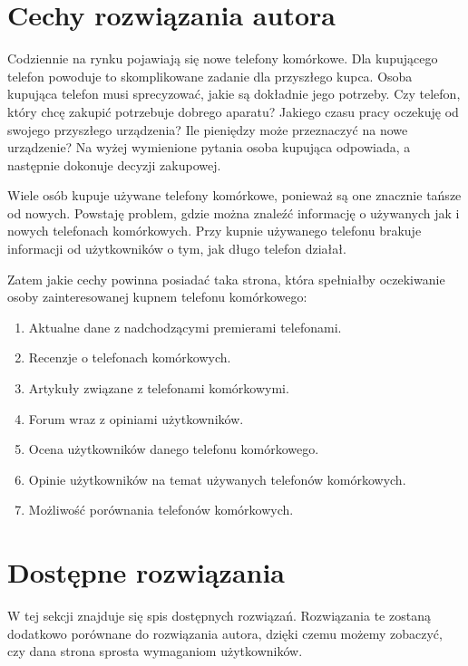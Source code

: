 \section{Cechy rozwiązania autora}
\label{ideal_solution}
Codziennie na rynku pojawiają się nowe telefony komórkowe. Dla kupującego telefon powoduje to skomplikowane zadanie dla przyszłego kupca. Osoba kupująca telefon musi sprecyzować, jakie są dokładnie jego potrzeby. Czy telefon, który chcę zakupić potrzebuje dobrego aparatu? Jakiego czasu pracy oczekuję od swojego przyszłego urządzenia? Ile pieniędzy może przeznaczyć na nowe urządzenie? Na wyżej wymienione pytania osoba kupująca odpowiada, a następnie dokonuje decyzji zakupowej.

Wiele osób kupuje używane telefony komórkowe, ponieważ są one znacznie tańsze od nowych. Powstaję problem, gdzie można znaleźć informację o używanych jak i nowych telefonach komórkowych. Przy kupnie używanego telefonu brakuje informacji od użytkowników o tym, jak długo telefon działał.  

Zatem jakie cechy powinna posiadać taka strona, która spełniałby oczekiwanie osoby zainteresowanej kupnem telefonu komórkowego:
\begin{enumerate}
    \item Aktualne dane z nadchodzącymi premierami telefonami.
    \item Recenzje o telefonach komórkowych.
    \item Artykuły związane z telefonami komórkowymi.
    \item Forum wraz z opiniami użytkowników.
    \item Ocena użytkowników danego telefonu komórkowego.
    \item Opinie użytkowników na temat używanych telefonów komórkowych.
    \item Możliwość porównania telefonów komórkowych.
\end{enumerate}

\section{Dostępne rozwiązania}
W tej sekcji znajduje się spis dostępnych rozwiązań. Rozwiązania te zostaną dodatkowo porównane do rozwiązania autora, dzięki czemu możemy zobaczyć, czy dana strona sprosta wymaganiom użytkowników.

